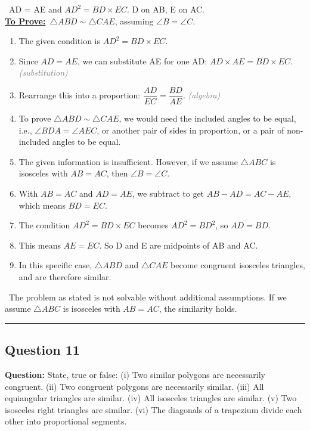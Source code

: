 \documentclass{article}
\newenvironment{steps}{%
  \begin{enumerate}[label=\textcolor{primary}{Step~\arabic*:}, leftmargin=*]
}{\end{enumerate}}
\newcommand{\sul}[1]{\uline{#1}}
\newcommand{\dul}[1]{\uuline{#1}}
\newcommand{\solutionheading}{{\raggedright\dul{\textbf{Solution}}\par}}
\newcommand{\given}[1]{\noindent\textbf{\textcolor{secondary}{\dul{Given:}}}~#1\\}
\newcommand{\toprove}[1]{\noindent\textbf{\textcolor{primary}{\sul{To Prove:}}}~#1\\}
\newcommand{\reason}[1]{\hfill\textit{\textcolor{gray}{(#1)}}}
\newcommand{\solutionrule}{\par\noindent\color{accent}\rule{\linewidth}{0.6pt}\par\smallskip}
\newcommand{\finalanswer}[1]{\noindent\textbf{\textcolor{accent}{\dul{Answer:}}}~#1\solutionrule}
\begin{document}
\solutionheading
\given{AD = AE and $AD^2 = BD \times EC$. D on AB, E on AC.}
\toprove{$\triangle ABD \sim \triangle CAE$, assuming $\angle B = \angle C$.}

\begin{center}
\end{center}

\begin{steps}
    \item The given condition is $AD^2 = BD \times EC$.
    \item Since $AD=AE$, we can substitute AE for one AD: $AD \times AE = BD \times EC$. \reason{substitution}
    \item Rearrange this into a proportion: $\dfrac{AD}{EC} = \dfrac{BD}{AE}$. \reason{algebra}
    \item To prove $\triangle ABD \sim \triangle CAE$, we would need the included angles to be equal, i.e., $\angle BDA = \angle AEC$, or another pair of sides in proportion, or a pair of non-included angles to be equal.
    \item The given information is insufficient. However, if we assume $\triangle ABC$ is isosceles with $AB=AC$, then $\angle B = \angle C$.
    \item With $AB=AC$ and $AD=AE$, we subtract to get $AB-AD = AC-AE$, which means $BD=EC$.
    \item The condition $AD^2 = BD \times EC$ becomes $AD^2 = BD^2$, so $AD=BD$.
    \item This means $AE=EC$. So D and E are midpoints of AB and AC.
    \item In this specific case, $\triangle ABD$ and $\triangle CAE$ become congruent isosceles triangles, and are therefore similar.
\end{steps}

\finalanswer{The problem as stated is not solvable without additional assumptions. If we assume $\triangle ABC$ is isosceles with $AB=AC$, the similarity holds.}

\subsection*{Question 11}
\textbf{Question:} State, true or false:
(i) Two similar polygons are necessarily congruent.
(ii) Two congruent polygons are necessarily similar.
(iii) All equiangular triangles are similar.
(iv) All isosceles triangles are similar.
(v) Two isosceles right triangles are similar.
(vi) The diagonals of a trapezium divide each other into proportional segments.
\end{document}
